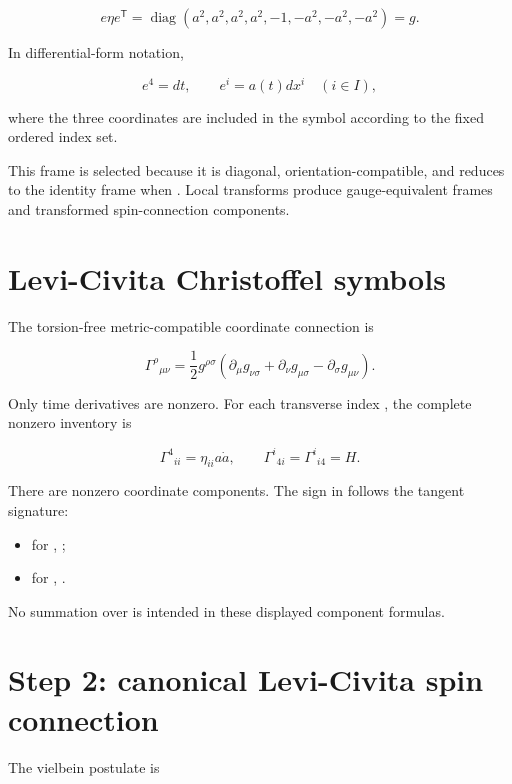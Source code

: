 \documentclass[11pt]{article}
\begin{document}
\[
e\eta e^{\mathsf T}
=\operatorname{diag}(a^2,a^2,a^2,a^2,-1,-a^2,-a^2,-a^2)
=g.
\]

In differential-form notation,

\[
e^4=dt,
\qquad e^i=a(t)dx^i\quad(i\in I),
\]

where the three \texttt{} coordinates are included in the symbol \texttt{} according to the fixed ordered index set.

This frame is selected because it is diagonal, orientation-compatible, and reduces to the identity frame when \texttt{}. Local \texttt{} transforms produce gauge-equivalent frames and transformed spin-connection components.

\section{Levi-Civita Christoffel symbols}

The torsion-free metric-compatible coordinate connection is

\[
\Gamma^\rho{}_{\mu\nu}
=\frac12 g^{\rho\sigma}
\left(\partial_\mu g_{\nu\sigma}
+\partial_\nu g_{\mu\sigma}
-\partial_\sigma g_{\mu\nu}\right).
\]

Only time derivatives are nonzero. For each transverse index \texttt{}, the complete nonzero inventory is

\[
\boxed{
\Gamma^4{}_{ii}=\eta_{ii}a\dot a,
\qquad
\Gamma^i{}_{4i}=\Gamma^i{}_{i4}=H.}
\]

There are \texttt{} nonzero coordinate components. The sign in \texttt{} follows the tangent signature:

\begin{itemize}
\item for \texttt{}, \texttt{};
\item for \texttt{}, \texttt{}.
\end{itemize}

No summation over \texttt{} is intended in these displayed component formulas.

\section{Step 2: canonical Levi-Civita spin connection}

The vielbein postulate is
\end{document}
